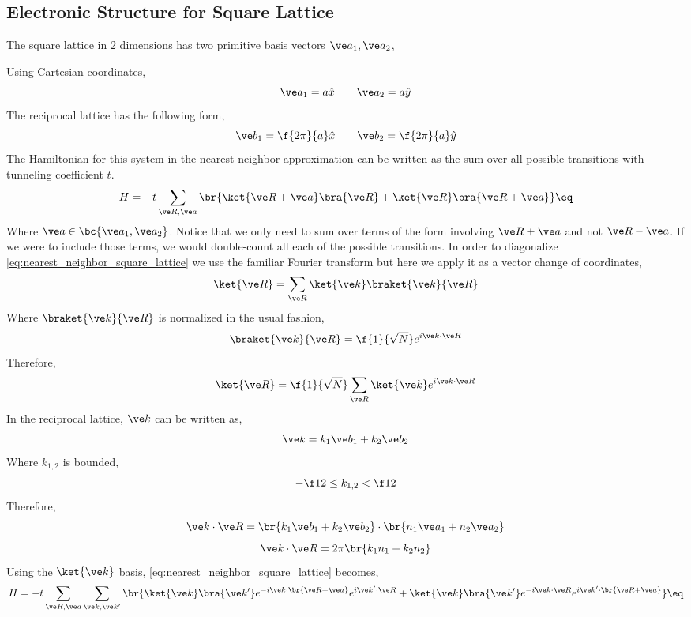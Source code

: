 \documentclass{article}
\begin{document}
\subsection{Electronic Structure for Square Lattice}

The square lattice in 2 dimensions has two primitive basis vectors $\ve a_{1}, \ve a_{2}$,
\begin{center}
\end{center}
Using Cartesian coordinates,
\[ \ve a_1 = a \hat x \qquad \ve a_2 = a \hat y \]
The reciprocal lattice has the following form,
\[ \ve b_1 = \f{2 \pi }{a}\hat x \qquad \ve b_2 = \f{2 \pi}{a} \hat y \]
The Hamiltonian for this system in the nearest neighbor approximation can be written as the sum over all possible transitions with tunneling coefficient $t$.
\[ H = - t \sum_{\ve R, \ve a} \br{\ket{\ve R + \ve a} \bra{\ve R} + \ket{\ve R} \bra{\ve R + \ve a}} \eq \label{eq:nearest_neighbor_square_lattice} \]
Where $\ve a \in \bc{\ve a_1, \ve a_2}$. Notice that we only need to sum over terms of the form involving $\ve R + \ve a$ and not $\ve R - \ve a$. If we were to include those terms, we would double-count all each of the possible transitions. In order to diagonalize \cref{eq:nearest_neighbor_square_lattice} we use the familiar Fourier transform but here we apply it as a vector change of coordinates,
\[\ket{\ve R} = \sum_{\ve R} \ket{\ve k} \braket{\ve k}{\ve R} \]
Where $\braket{\ve k}{\ve R}$ is normalized in the usual fashion,
\[ \braket{\ve k}{\ve R} = \f{1}{\sqrt{N}} e^{i \ve k \cdot \ve R} \]
Therefore,
\[\ket{\ve R} = \f{1}{\sqrt{N}} \sum_{\ve R} \ket{\ve k}  e^{i \ve k \cdot \ve R} \]
In the reciprocal lattice, $\ve k$ can be written as,
\[ \ve k = k_1 \ve b_1 + k_2 \ve b_2 \]
Where $k_{1,2}$ is bounded,
\[ -\f12 \leq k_{1,2} < \f12 \]
Therefore,
\[ \ve k \cdot \ve R = \br{k_1 \ve b_1 + k_2 \ve b_2} \cdot \br{n_1 \ve a_1 + n_2 \ve a_2} \]
\[ \ve k \cdot \ve R = 2 \pi \br{k_1 n_1 + k_2 n_2} \]
Using the $\ket{\ve k}$ basis, \cref{eq:nearest_neighbor_square_lattice} becomes,
\[ H = - t \sum_{\ve R, \ve a} \sum_{\ve k, \ve k'} \br{\ket{\ve k}\bra{\ve k'} e^{-i \ve k \cdot \br{\ve R + \ve a}} e^{i \ve k' \cdot \ve R} + \ket{\ve k}\bra{\ve k'} e^{-i \ve k \cdot \ve R} e^{i \ve k' \cdot \br{\ve R + \ve a}}} \eq \label{eq:nearest_neighbor_square_lattice_momentum} \]
\end{document}
